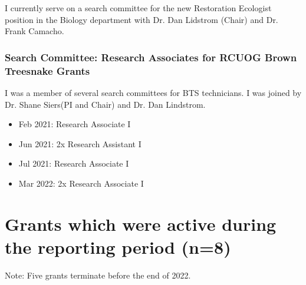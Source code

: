 I currently serve on a search committee for the new Restoration Ecologist position in the Biology department with Dr. Dan Lidstrom (Chair) and Dr. Frank Camacho.

\subsubsection{Search Committee: Research Associates for RCUOG Brown Treesnake Grants}

I was a member of several search committees for BTS technicians. I was joined by Dr. Shane Siers(PI and Chair) and Dr. Dan Lindstrom.
\begin{itemize}
	\item Feb 2021: Research Associate I
    \item Jun 2021: 2x Research Assistant I
    \item Jul 2021: Research Associate I
	\item Mar 2022: 2x Research Associate I
\end{itemize}


\newpage
\section{Grants which were active during the reporting period (n=8)}

Note: Five grants terminate before the end of 2022.

